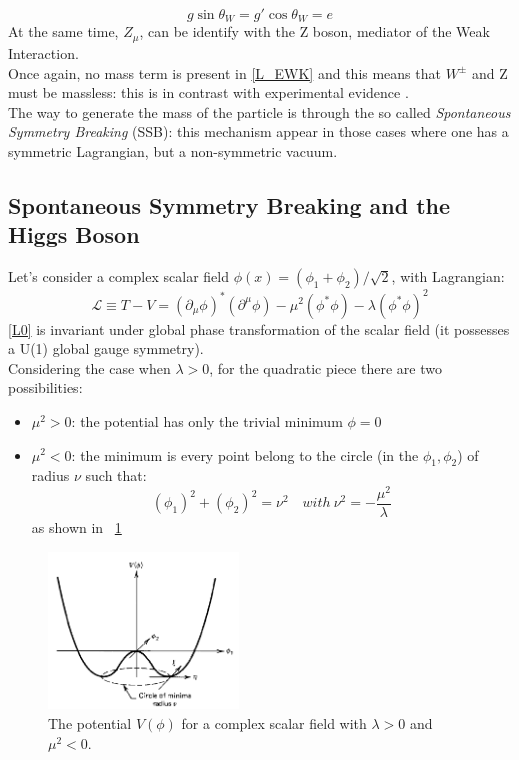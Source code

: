 \begin{equation}
g\sin\theta_{W} = g'\cos\theta_{W} = e
\label{g_gprime}
\end{equation}
At the same time, $Z_{\mu}$, can be identify with the Z boson, mediator of the Weak Interaction. \\
Once again, no mass term is present in \ref{L_EWK} and this means that $W^{\pm}$ and Z must be massless: this is in contrast with experimental evidence \cite{Wboson}\cite{Zboson}. \\
The way to generate the mass of the particle is through the so called \textit{Spontaneous Symmetry Breaking} (SSB): this mechanism appear in those cases where one has a symmetric Lagrangian, but a non-symmetric vacuum. 

\subsection{Spontaneous Symmetry Breaking and the Higgs Boson}
Let's consider a complex scalar field $\phi(x) = (\phi_{1} + \phi_{2}) / \sqrt{2}$, with Lagrangian:
\begin{equation}
\mathcal{L} \equiv T - V = (\partial_{\mu}\phi)^{*}(\partial^{\mu}\phi) - \mu^{2}(\phi^{*}\phi)-\lambda(\phi^{*}\phi)^{2}
\label{L0}
\end{equation}
\ref{L0} is invariant under global phase transformation of the scalar field (it possesses a U(1) global gauge symmetry). \\
Considering the case when $\lambda > 0$, for the quadratic piece there are two possibilities:
\begin{itemize}
\item{$\mu^{2} > 0$:} the potential has only the trivial minimum $\phi = 0$
\item{$\mu^{2} < 0$:} the minimum is every point belong to the circle (in the $\phi_{1}, \phi_{2}$) of radius $\nu$ such that:
	\begin{equation}
	(\phi_{1})^{2}+(\phi_{2})^{2} = \nu^{2} \quad with\ \nu^{2} = - \frac{\mu^{2}}{\lambda}
	\end{equation}
	as shown in \figurename~\ref{V_phi_potential}
\end{itemize}
\begin{figure}[htbp]
\centering
\includegraphics[width=0.45\textwidth]{Images/Vphi.png}
\caption{The potential $V(\phi)$ for a complex scalar field with $\lambda > 0$ and $\mu^{2} < 0$. }
\label{V_phi_potential}
\end{figure}
